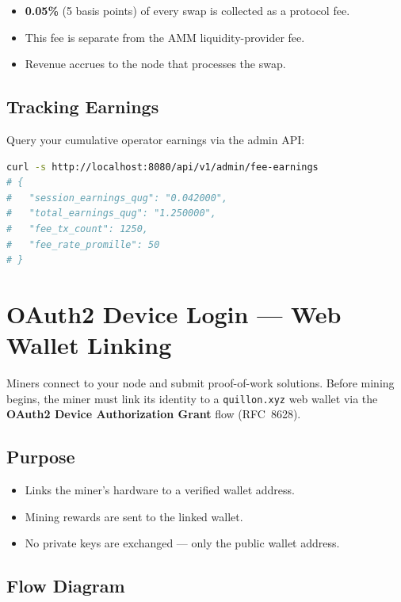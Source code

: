 \documentclass[11pt,a4paper]{article}
\begin{document}
\begin{itemize}[nosep]
    \item \textbf{0.05\%} (5 basis points) of every swap is collected as a protocol fee.
    \item This fee is separate from the AMM liquidity-provider fee.
    \item Revenue accrues to the node that processes the swap.
\end{itemize}

\subsection{Tracking Earnings}

Query your cumulative operator earnings via the admin API:

\begin{lstlisting}[language=bash,title={Check operator fee earnings}]
curl -s http://localhost:8080/api/v1/admin/fee-earnings
# {
#   "session_earnings_qug": "0.042000",
#   "total_earnings_qug": "1.250000",
#   "fee_tx_count": 1250,
#   "fee_rate_promille": 50
# }
\end{lstlisting}

\section{OAuth2 Device Login --- Web Wallet Linking}

Miners connect to your node and submit proof-of-work solutions. Before
mining begins, the miner must link its identity to a \texttt{quillon.xyz}
web wallet via the \textbf{OAuth2 Device Authorization Grant} flow
(RFC~8628).

\subsection{Purpose}

\begin{itemize}[nosep]
    \item Links the miner's hardware to a verified wallet address.
    \item Mining rewards are sent to the linked wallet.
    \item No private keys are exchanged --- only the public wallet address.
\end{itemize}

\subsection{Flow Diagram}
\end{document}
